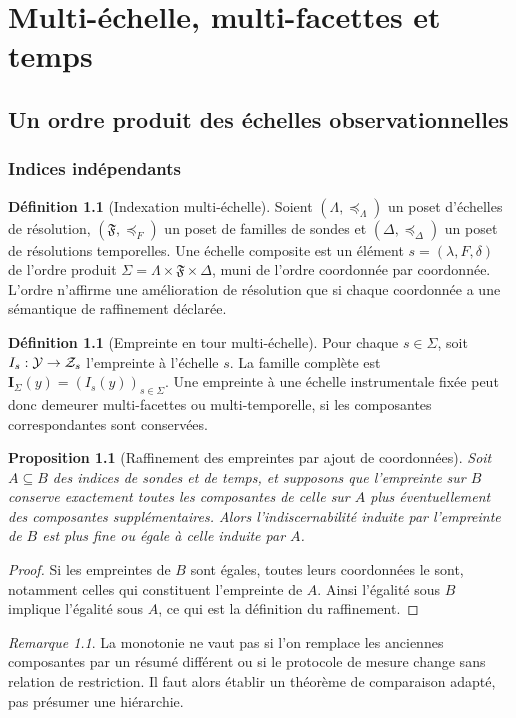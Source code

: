\documentclass[11pt,oneside]{book}
\newtheorem{proposition}[theoreme]{Proposition}
\theoremstyle{definition}\newtheorem{definition}[theoreme]{Définition}\newtheorem{hypothese}[theoreme]{Hypothèse explicite}\newtheorem{convention}[theoreme]{Convention}\newtheorem{critere}[theoreme]{Critère}
\theoremstyle{remark}\newtheorem{remarque}[theoreme]{Remarque}\newtheorem{contreexemple}[theoreme]{Contre-exemple}
\begin{document}
\part{Multi-échelle, multi-facettes et temps}
\chapter{Un ordre produit des échelles observationnelles}
\section{Indices indépendants}
\begin{definition}[Indexation multi-échelle]
Soient \((\Lambda,\preceq_\Lambda)\) un poset d'échelles de résolution, \((\mathfrak F,\preceq_F)\) un poset de familles de sondes et \((\Delta,\preceq_\Delta)\) un poset de résolutions temporelles. Une échelle composite est un élément \(s=(\lambda,F,\delta)\) de l'ordre produit \(\Sigma=\Lambda\times\mathfrak F\times\Delta\), muni de l'ordre coordonnée par coordonnée. L'ordre n'affirme une amélioration de résolution que si chaque coordonnée a une sémantique de raffinement déclarée.
\end{definition}
\begin{definition}[Empreinte en tour multi-échelle]
Pour chaque \(s\in\Sigma\), soit \(I_s:\mathcal Y\to\mathcal Z_s\) l'empreinte à l'échelle \(s\). La famille complète est \(\mathbf I_\Sigma(y)=(I_s(y))_{s\in\Sigma}\). Une empreinte à une échelle instrumentale fixée peut donc demeurer multi-facettes ou multi-temporelle, si les composantes correspondantes sont conservées.
\end{definition}
\begin{proposition}[Raffinement des empreintes par ajout de coordonnées]
Soit \(A\subseteq B\) des indices de sondes et de temps, et supposons que l'empreinte sur \(B\) conserve exactement toutes les composantes de celle sur \(A\) plus éventuellement des composantes supplémentaires. Alors l'indiscernabilité induite par l'empreinte de \(B\) est plus fine ou égale à celle induite par \(A\).
\end{proposition}
\begin{proof}
Si les empreintes de \(B\) sont égales, toutes leurs coordonnées le sont, notamment celles qui constituent l'empreinte de \(A\). Ainsi l'égalité sous \(B\) implique l'égalité sous \(A\), ce qui est la définition du raffinement.\end{proof}
\begin{remarque}
La monotonie ne vaut pas si l'on remplace les anciennes composantes par un résumé différent ou si le protocole de mesure change sans relation de restriction. Il faut alors établir un théorème de comparaison adapté, pas présumer une hiérarchie.
\end{remarque}
\end{document}

